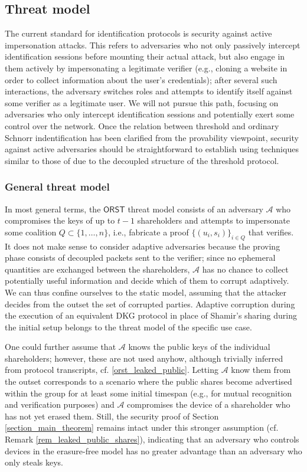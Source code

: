 \documentclass{iacrtrans}
\begin{document}
\subsection{Threat model}\label{section_threat_model}

The current standard for identification protocols is
security against active impersonation attacks. This refers to
adversaries who not only passively intercept identification
sessions before mounting their actual attack,
but also engage in them actively by impersonating
a legitimate verifier (e.g., cloning a website in order
to collect information about the user's credentials);
after several such interactions, the adversary switches roles
and attempts to identify itself against some verifier as a
legitimate user.
We will not pursue this path, focusing
on adversaries who only intercept
identification sessions and potentially exert
some control over the network.
Once the relation between threshold and ordinary
Schnorr indentification has been clarified
from the provability viewpoint,
security against active adversaries should be straightforward
to establish using techniques similar to those
of \cite{paper_bellare_palacio}
due to the decoupled structure of the threshold protocol.

\subsubsection{General threat model}\label{section_general_threat_model}

In most general terms, the $\textsf{ORST}$ threat model
consists of an
adversary $\mathcal{A}$ who compromises the keys
of up to $t-1$ shareholders
and attempts to impersonate some coalition
$Q \subset \{1, \dots, n\}$,
i.e., fabricate a proof
$\{(u_i, s_i)\}_{i \in Q}$ that verifies.
It does not make sense to consider adaptive adversaries
because the proving phase consists of decoupled
packets sent to the verifier;
since no ephemeral quantities are exchanged between the shareholders,
$\mathcal{A}$ has no chance to collect potentially
useful information and decide which of them
to corrupt adaptively.
We can thus confine ourselves to the static model,
assuming that the attacker decides from the outset the
set of corrupted parties.
Adaptive corruption during the execution
of an equivalent DKG protocol in place of Shamir's sharing during
the initial setup belongs to the threat model
of the specific use case.

One could further
assume that $\mathcal{A}$ knows
the public keys of the individual shareholders;
however, these are not used anyhow,
although trivially inferred from protocol transcripts,
cf. \eqref{orst_leaked_public}.
Letting $\mathcal{A}$ know them from the outset
corresponds to a scenario where the public shares
become advertised within the group
for at least some initial timespan
(e.g., for mutual recognition and verification purposes)
and $\mathcal{A}$ compromises the device
of a shareholder who has not yet erased them.
Still, the security proof of
Section \ref{section_main_theorem}
remains intact under this stronger assumption
(cf. Remark \ref{rem_leaked_public_shares}), indicating that
an adversary who controls devices
in the erasure-free model has no greater advantage than an
adversary who only steals keys.
\end{document}
